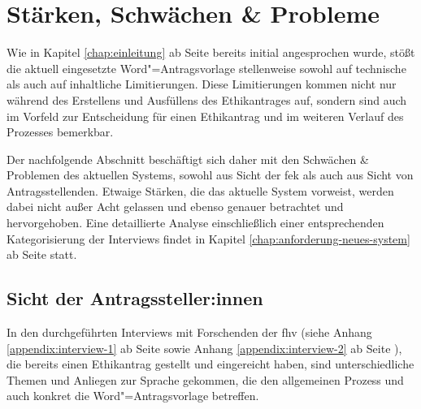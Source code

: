 \documentclass[a4paper,12pt,twoside]{scrreprt}
\begin{document}
\section{Stärken, Schwächen \& Probleme}
\label{sec:stärken-schwächen-probleme}

Wie in Kapitel \ref{chap:einleitung} ab Seite \pageref{chap:einleitung} bereits initial angesprochen wurde, stößt die aktuell eingesetzte Word"=Antragsvorlage stellenweise sowohl auf technische als auch auf inhaltliche Limitierungen. Diese Limitierungen kommen nicht nur während des Erstellens und Ausfüllens des Ethikantrages auf, sondern sind auch im Vorfeld zur Entscheidung für einen Ethikantrag und im weiteren Verlauf des Prozesses bemerkbar.

Der nachfolgende Abschnitt beschäftigt sich daher mit den Schwächen \& Problemen des aktuellen Systems, sowohl aus Sicht der \ac{fek} als auch aus Sicht von Antragsstellenden. Etwaige Stärken, die das aktuelle System vorweist, werden dabei nicht außer Acht gelassen und ebenso genauer betrachtet und hervorgehoben. Eine detaillierte Analyse einschließlich einer entsprechenden Kategorisierung der Interviews findet in Kapitel \ref{chap:anforderung-neues-system} ab Seite \pageref{chap:anforderung-neues-system} statt.

\subsection{Sicht der Antragssteller:innen}
\label{sub-sec:probleme-sicht-antragssteller}

In den durchgeführten Interviews mit Forschenden der \ac{fhv} (siehe Anhang \ref{appendix:interview-1} ab Seite \pageref{appendix:interview-1} sowie Anhang \ref{appendix:interview-2} ab Seite \pageref{appendix:interview-2}), die bereits einen Ethikantrag gestellt und eingereicht haben, sind unterschiedliche Themen und Anliegen zur Sprache gekommen, die den allgemeinen Prozess und auch konkret die Word"=Antragsvorlage betreffen.
\end{document}
